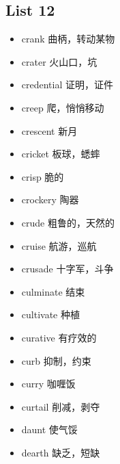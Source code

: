\documentclass[a4paper,10pt]{article}
\begin{document}
\begin{CJK*}{UTF8}{gkai}
\newpage
\section{List 12}
\begin{itemize}
\item crank 曲柄，转动某物 
\hspace{1cm}
\item crater 火山口，坑
\hspace{1cm}
\item credential 证明，证件
\hspace{1cm}
\item creep 爬，悄悄移动
\hspace{1cm}
\item crescent 新月
\hspace{1cm}
\item cricket 板球，蟋蟀
\hspace{1cm}
\item crisp 脆的
\hspace{1cm}
\item crockery 陶器
\hspace{1cm}
\item crude 粗鲁的，天然的
\hspace{1cm}
\item cruise 航游，巡航
\hspace{1cm}
\item crusade 十字军，斗争
\hspace{1cm}
\item culminate 结束
\hspace{1cm}
\item cultivate 种植
\hspace{1cm}
\item curative 有疗效的
\hspace{1cm}
\item curb 抑制，约束
\hspace{1cm}
\item curry 咖喱饭
\hspace{1cm}
\item curtail 削减，剥夺
\hspace{1cm}
\item daunt 使气馁
\hspace{1cm}
\item dearth 缺乏，短缺
\hspace{1cm}
\end{itemize}



\newpage

\end{CJK*}
\end{document}

